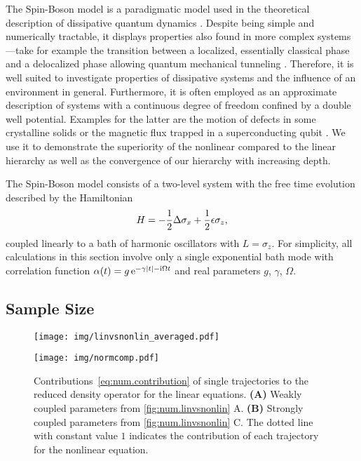 The Spin-Boson model is a paradigmatic model used in the theoretical description of dissipative quantum dynamics \cite{Le87_spinboson,We99_dissipative_systems}.
Despite being simple and numerically tractable, it displays properties also found in more complex systems---take for example the transition between a localized, essentially classical phase and a delocalized phase allowing quantum mechanical tunneling \cite{FlVeNa10_spin_boson}.
Therefore, it is well suited to investigate properties of dissipative systems and the influence of an environment in general.
Furthermore, it is often employed as an approximate description of systems with a continuous degree of freedom confined by a double well potential.
Examples for the latter are the motion of defects in some crystalline solids or the magnetic flux trapped in a superconducting qubit \cite{CaLe83_diss_system}.
We use it to demonstrate the superiority of the nonlinear compared to the linear hierarchy as well as the convergence of our hierarchy with increasing depth.

The Spin-Boson model consists of a two-level system with the free time evolution described by the Hamiltonian
\begin{equation*}
  H = - \frac{1}{2}\Delta \sigma_x + \frac{1}{2} \epsilon \sigma_z,
\end{equation*}
coupled linearly to a bath of harmonic oscillators with $L=\sigma_z$.
For simplicity, all calculations in this section involve only a single exponential bath mode with correlation function $\alpha(t) = g \,\exp[-\gamma \abs{t} - \ii\Omega t]$ and real parameters $g$, $\gamma$, $\Omega$.


\subsection{Sample Size}
\label{sub:num.spin_boson.sample_size}
%

\begin{figure}[p]
  \centering
  \texttt{[image: img/linvsnonlin\_averaged.pdf]}
  \caption{%
    $\qmean{\sigma_z}$ of the symmetric Spin-Boson model ($\epsilon = 0$) using the linear (left) and nonlinear (right) \NMSSE-hierarchy.\\
    \textbf{(A)} and \textbf{(C)} weakly coupled system with $g=0.18\Delta$, $\gamma=0.05\Delta$ and $\Omega=\Delta$.
    \textbf{(B)} and \textbf{(D)} strongly coupled system with $g=2\Delta$, $\gamma=0.5\Delta$ and $\Omega=2\Delta$.
    \label{fig:num.linvsnonlin}
  }
  \vspace{.5cm}
  \texttt{[image: img/normcomp.pdf]}
  \caption{%
    Contributions~\ref{eq:num.contribution} of single trajectories to the reduced density operator for the linear equations.
    \textbf{(A)} Weakly coupled parameters from \autoref{fig:num.linvsnonlin} A.
    \textbf{(B)} Strongly coupled parameters from \autoref{fig:num.linvsnonlin} C.
    The dotted line with constant value $1$ indicates the contribution of each trajectory for the nonlinear equation.
    \label{fig:num.normcomp}
  }
\end{figure}

